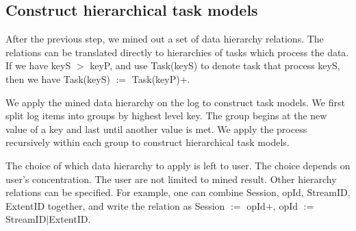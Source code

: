 \subsection{Construct hierarchical task models}

After the previous step, we mined out a set of data
hierarchy relations. The relations can be translated
directly to hierarchies of tasks which process the data. 
If we have keyS $>$ keyP, and use Task(keyS) to denote task
that process keyS, then we have Task(keyS) $:=$
Task(keyP)$+$.

We apply the mined data hierarchy on the log to construct
task models. We first split log items into groups by highest
level key. The group begins at the new value of a key and
last until another value is met. We apply the process
recursively within each group to construct hierarchical task
models.


The choice of which data hierarchy to apply is left to user.
The choice depends on user's concentration. The user are not
limited to mined result. Other hierarchy relations can be
specified. For example, one can combine Session, opId,
StreamID, ExtentID together, and write the relation as
Session $:=$ opId$+$, opId $:=$ StreamID$|$ExtentID.

